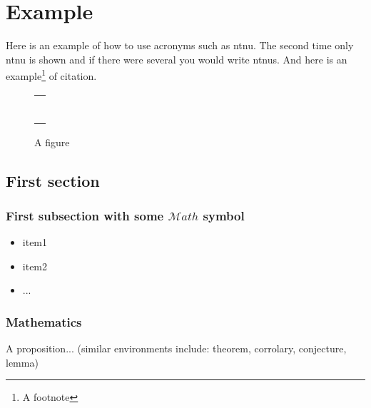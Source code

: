 \chapter{Example}
\label{chp:example} 

Here is an example of how to use acronyms such as \gls{ntnu}. The second time only \gls{ntnu} is shown and if there were several you would write \glspl{ntnu}. And here is an example\footnote{A footnote} of citation.

\Blindtext[3][1]

\begin{figure}
\centering
\begin{tabular}{@{}c@{}}
\rule{.5\textwidth}{.5\textwidth} \\
\end{tabular}
\caption{\label{fig:example}A figure}
\end{figure}

\section{First section}\label{sec:first_section}

\subsection{First subsection with some \texorpdfstring{$\mathcal{M}ath$}{Math} symbol}\label{sec:first_ssection}

\blindtext
\begin{itemize}[topsep=-1em,parsep=0em,itemsep=0em] %
 \item item1
 \item item2
 \item ...
\end{itemize}

\subsection{Mathematics}

\blindmathtrue
\blindtext

\begin{proposition}\label{def:a_proposition}
A proposition... (similar environments include: theorem, corrolary, conjecture, lemma)

\end{proposition}

